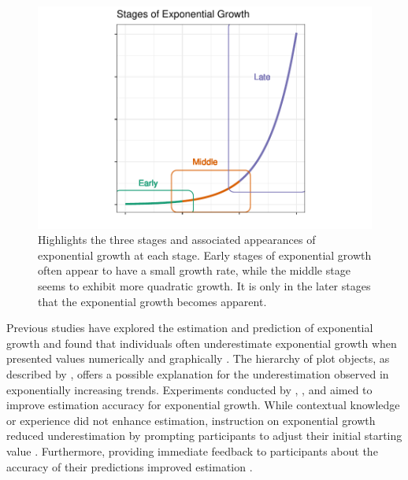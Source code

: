 \documentclass[12pt]{article}
\begin{document}
\begin{figure}[tbp]

{\centering \includegraphics[width=1\linewidth,]{logarithmic-lineups_files/figure-latex/exponential-stages-1} 

}

\caption{Highlights the three stages and associated appearances of exponential growth at each stage. Early stages of exponential growth often appear to have a small growth rate, while the middle stage seems to exhibit more quadratic growth. It is only in the later stages that the exponential growth becomes apparent.}\label{fig:exponential-stages}
\end{figure}

Previous studies have explored the estimation and prediction of
exponential growth and found that individuals often underestimate
exponential growth when presented values numerically and graphically
\citep{wagenaar_misperception_1975}. The hierarchy of plot objects, as
described by \citet{cleveland_graphical_1985}, offers a possible
explanation for the underestimation observed in exponentially increasing
trends. Experiments conducted by \citet{wagenaar_misperception_1975},
\citet{jones_polynomial_1977}, and \citet{mackinnon_feedback_1991} aimed
to improve estimation accuracy for exponential growth. While contextual
knowledge or experience did not enhance estimation, instruction on
exponential growth reduced underestimation by prompting participants to
adjust their initial starting value
\citep{wagenaar_misperception_1975, jones_polynomial_1977}. Furthermore,
providing immediate feedback to participants about the accuracy of their
predictions improved estimation \citep{mackinnon_feedback_1991}.
\end{document}
